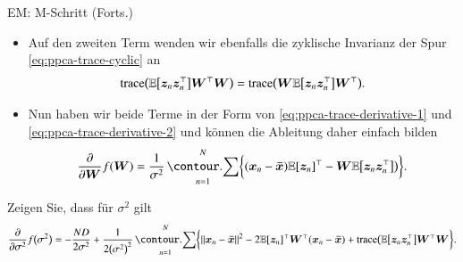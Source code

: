 \begin{frame}{EM: M-Schritt (Forts.)}{}
	\begin{itemize}
		\item Auf den zweiten Term wenden wir ebenfalls die zyklische Invarianz der Spur \eqref{eq:ppca-trace-cyclic} an
		\begin{equation}
			\operatorname{\text{trace}}\bigl( \mathbb{E}\bigl[ \bm{z}_n \bm{z}_n^\top \bigr] \bm{W}^\top \bm{W} \bigr)
				= \operatorname{\text{trace}}\bigl( \bm{W} \mathbb{E}\bigl[ \bm{z}_n \bm{z}_n^\top \bigr] \bm{W}^\top \bigr).
		\end{equation}
		\item Nun haben wir beide Terme in der Form von \eqref{eq:ppca-trace-derivative-1} und \eqref{eq:ppca-trace-derivative-2}
			und können die Ableitung daher einfach bilden
		\begin{equation}
			\frac{\partial}{\partial \bW} f(\bW)
				= \frac{1}{\sigma^2} \sum_{n=1}^N \biggl\{
					(\bx_n - \bxmean) \E[\bz_n]^\top - \bW \E\bigl[ \bz_n \bz_n^\top \bigr] \bigr)
				\biggr\}.
		\end{equation}
	\end{itemize}
	
	\begin{mytask}
		Zeigen Sie, dass für $\sigma^2$ gilt
		\begin{equation}
			\frac{\partial}{\partial \sigma^2} f\bigl( \sigma^2 \bigr)
				= -\frac{N D}{2 \sigma^2} + \frac{1}{2 \bigl( \sigma^2 \bigr)^2} \sum_{n=1}^N \biggl\{
					\Vert \bx_n - \bxmean \Vert^2 - 2 \E[\bz_n]^\top \bW^\top (\bx_n - \bxmean) +
					\trace\bigl( \E\bigl[ \bz_n \bz_n^\top \bigr] \bW^\top \bW
				\biggr\}.
		\end{equation}
	\end{mytask}
\end{frame}



